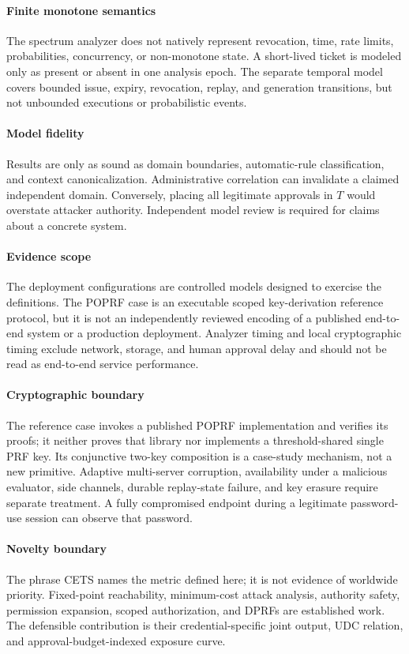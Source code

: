 \documentclass[preprint,12pt]{elsarticle}
\begin{document}
\paragraph{Finite monotone semantics}
The spectrum analyzer does not natively represent revocation, time, rate
limits, probabilities, concurrency, or non-monotone state.  A short-lived
ticket is modeled only as present or absent in one analysis epoch.  The
separate temporal model covers bounded issue, expiry, revocation, replay, and
generation transitions, but not unbounded executions or probabilistic events.

\paragraph{Model fidelity}
Results are only as sound as domain boundaries, automatic-rule classification,
and context canonicalization.  Administrative correlation can invalidate a
claimed independent domain.  Conversely, placing all legitimate approvals in
$T$ would overstate attacker authority.  Independent model review is required
for claims about a concrete system.

\paragraph{Evidence scope}
The deployment configurations are controlled models designed to exercise the
definitions.  The POPRF case is an executable scoped key-derivation reference
protocol, but
it is not an independently reviewed encoding of a published end-to-end system
or a production deployment.  Analyzer timing and local cryptographic timing
exclude network, storage, and human approval delay and should not be read as
end-to-end service performance.

\paragraph{Cryptographic boundary}
The reference case invokes a published POPRF implementation and verifies its
proofs; it neither proves that library nor implements a threshold-shared single
PRF key.  Its conjunctive two-key composition is a case-study mechanism, not a
new primitive.  Adaptive multi-server corruption, availability under a
malicious evaluator, side channels, durable replay-state failure, and key
erasure require separate treatment.  A fully compromised endpoint during a
legitimate password-use session can observe that password.

\paragraph{Novelty boundary}
The phrase CETS names the metric defined here; it is not evidence of worldwide
priority.  Fixed-point reachability, minimum-cost attack analysis, authority
safety, permission expansion, scoped authorization, and DPRFs are established
work.  The defensible contribution is their credential-specific joint output,
UDC relation, and approval-budget-indexed exposure curve.
\end{document}
